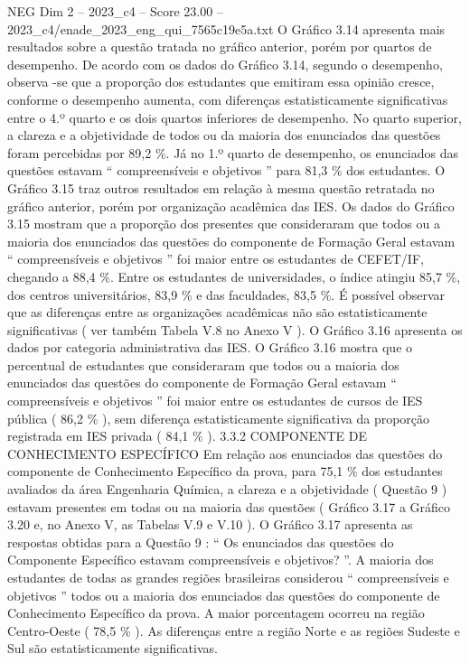 \begin{textsample}{NEG Dim 2 – 2023\_c4 – Score 23.00 – 2023\_c4/enade\_2023\_eng\_qui\_7565c19e5a.txt}
O Gráfico 3.14 apresenta mais resultados sobre a questão tratada no gráfico anterior, porém por quartos de desempenho.
De acordo com os dados do Gráfico 3.14, segundo o desempenho, observa -se que a proporção dos estudantes que emitiram essa opinião cresce, conforme o desempenho aumenta, com diferenças estatisticamente significativas entre o 4.º quarto e os dois quartos inferiores de desempenho.
No quarto superior, a clareza e a objetividade de todos ou da maioria dos enunciados das questões foram percebidas por 89,2 \%.
Já no 1.º quarto de desempenho, os enunciados das questões estavam “ compreensíveis e objetivos ” para 81,3 \% dos estudantes.
O Gráfico 3.15 traz outros resultados em relação à mesma questão retratada no gráfico anterior, porém por organização acadêmica das IES.
Os dados do Gráfico 3.15 mostram que a proporção dos presentes que consideraram que todos ou a maioria dos enunciados das questões do componente de Formação Geral estavam “ compreensíveis e objetivos ” foi maior entre os estudantes de CEFET/IF, chegando a 88,4 \%.
Entre os estudantes de universidades, o índice atingiu 85,7 \%, dos centros universitários, 83,9 \% e das faculdades, 83,5 \%.
É possível observar que as diferenças entre as organizações acadêmicas não são estatisticamente significativas ( ver também Tabela V.8 no Anexo V ).
O Gráfico 3.16 apresenta os dados por categoria administrativa das IES.
O Gráfico 3.16 mostra que o percentual de estudantes que consideraram que todos ou a maioria dos enunciados das questões do componente de Formação Geral estavam “ compreensíveis e objetivos ” foi maior entre os estudantes de cursos de IES pública ( 86,2 \% ), sem diferença estatisticamente significativa da proporção registrada em IES privada ( 84,1 \% ). 3.3.2 COMPONENTE DE CONHECIMENTO ESPECÍFICO Em relação aos enunciados das questões do componente de Conhecimento Específico da prova, para 75,1 \% dos estudantes avaliados da área Engenharia Química, a clareza e a objetividade ( Questão 9 ) estavam presentes em todas ou na maioria das questões ( Gráfico 3.17 a Gráfico 3.20 e, no Anexo V, as Tabelas V.9 e V.10 ).
O Gráfico 3.17 apresenta as respostas obtidas para a Questão 9 : “ Os enunciados das questões do Componente Específico estavam compreensíveis e objetivos? ”.
A maioria dos estudantes de todas as grandes regiões brasileiras considerou “ compreensíveis e objetivos ” todos ou a maioria dos enunciados das questões do componente de Conhecimento Específico da prova.
A maior porcentagem ocorreu na região Centro-Oeste ( 78,5 \% ).
As diferenças entre a região Norte e as regiões Sudeste e Sul são estatisticamente significativas.

\end{textsample}
